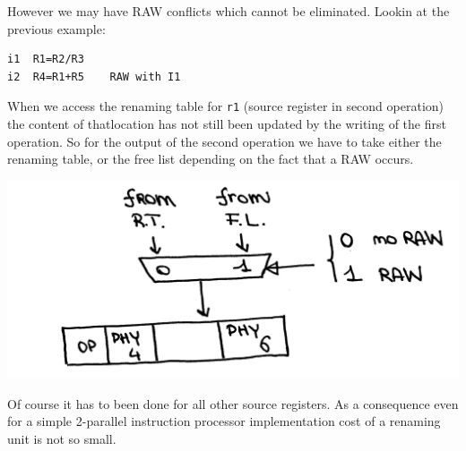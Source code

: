 However we may have RAW conflicts which cannot be eliminated.
Lookin at the previous example:
\begin{verbatim}
i1  R1=R2/R3
i2  R4=R1+R5    RAW with I1
\end{verbatim}
When we access the renaming table for \verb|r1| (source register in second
operation) the content of thatlocation has not still been updated by the
writing of the first operation. So for the output of the second operation we
have to take either the renaming table, or the free list depending on the
fact that a RAW occurs.
\begin{center}
  \includegraphics[width=0.7\linewidth]{img/img3/27}
\end{center}
Of course it has to been done for all other source registers. As a consequence
even for a simple 2-parallel instruction processor implementation cost of a
renaming unit is not so small.


